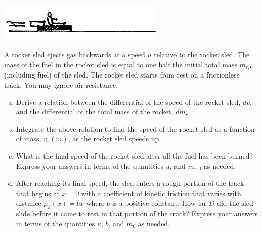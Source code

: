 \documentclass{esg8012exam}
\begin{document}
\clearpage
\writetoproblems{\cleardoublepage}

\begin{problem}{35}
  \begin{center}\includegraphics[width=0.6\textwidth]{exam2_p3_1}\end{center}
  A rocket sled ejects gas backwards at a speed $u$ relative to the rocket sled. The mass of the fuel in the rocket sled is equal to one half the initial total mass $m_{r,0}$ (including fuel) of the sled.  The rocket sled starts from rest on a frictionless track. You may ignore air resistance.
  \begin{enumerate}[(a)]
    \item Derive a relation between the differential of the speed of the rocket sled, $dv$, and the differential of the total mass of the rocket, $dm_r$.
    \item Integrate the above relation to find the speed of the rocket sled as a function of mass, $v_r(m)$, as the rocket sled speeds up.
    \item What is the final speed of the rocket sled after all the fuel has been burned?  Express your answers in terms of the quantities $u$, and $m_{r,0}$ as needed.
    \item After reaching its final speed, the sled enters a rough portion of the track that begins at $x=0$ with a coefficient of kinetic friction that varies with distance $\mu_k(x) = bx$ where $b$ is a positive constant.  How far $D$ did the sled slide before it came to rest in that portion of the track? Express your answers in terms of the quantities $u$, $b$, and $m_0$ as needed.
  \end{enumerate}
\end{problem}
\end{document}
